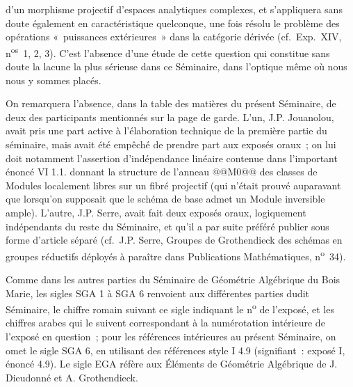 d'un morphisme projectif d'espaces analytiques complexes, et s'appliquera sans doute également en caractéristique quelconque, une fois résolu le problème des opérations «~puissances extérieures~» dans la catégorie dérivée (cf.\ Exp.\ XIV, n\textsuperscript{os}~1, 2, 3). C'est l'absence d'une étude de cette question qui constitue sans doute la lacune la plus sérieuse dans ce Séminaire, dans l'optique même où nous nous y sommes placés.

On remarquera l'absence, dans la table des matières du présent Séminaire, de deux des participants mentionnés sur la page de garde. L'un, J.P. Jouanolou, avait pris une part active à l'élaboration technique de la première partie du séminaire, mais avait été empêché de prendre part aux exposés oraux~; on lui doit notamment l'assertion d'indépendance linéaire contenue dans l'important énoncé VI 1.1. donnant la structure de l'anneau @@M0@@ des classes de Modules localement libres sur un fibré projectif (qui n'était prouvé auparavant que lorsqu'on supposait que le schéma de base admet un Module inversible ample). L'autre, J.P. Serre, avait fait deux exposés oraux, logiquement indépendants du reste du Séminaire, et qu'il a par suite préféré publier sous forme d'article séparé (cf.\ J.P. Serre, Groupes de Grothendieck des schémas en groupes réductifs déployés à paraître dans Publications Mathématiques, n\textsuperscript{o}~34).

Comme dans les autres parties du Séminaire de Géométrie Algébrique du Bois Marie, les sigles SGA 1 à SGA 6 renvoient aux différentes parties dudit Séminaire, le chiffre romain suivant ce sigle indiquant le n\textsuperscript{o} de l'exposé, et les chiffres arabes qui le suivent correspondant à la numérotation intérieure de l'exposé en question~; pour les références intérieures au présent Séminaire, on omet le sigle SGA 6, en utilisant des références style I 4.9 (signifiant~: exposé I, énoncé 4.9). Le sigle EGA réfère aux Éléments de Géométrie Algébrique de J. Dieudonné et A. Grothendieck.

